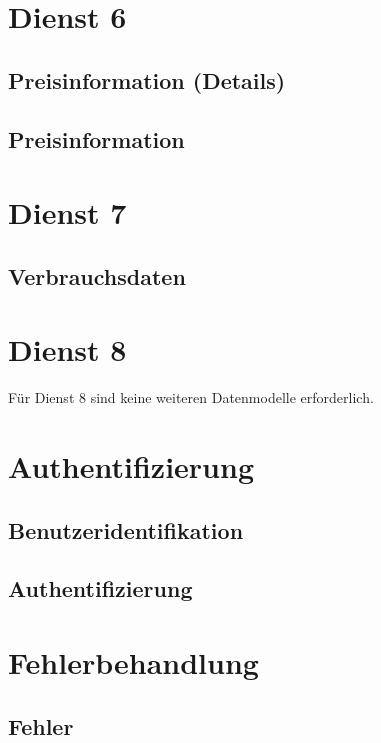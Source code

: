 \section{Dienst 6}
\label{sec:Datenmodell:Dienst6}

\subsection*{Preisinformation (Details)}



\subsection*{Preisinformation}




\section{Dienst 7}
\label{sec:Datenmodell:Dienst7}

\subsection*{Verbrauchsdaten}




\section{Dienst 8}
\label{sec:Datenmodell:Dienst8}
Für Dienst 8 sind keine weiteren Datenmodelle erforderlich.


\section{Authentifizierung}
\label{sec:Datenmodell:Auth}

\subsection*{Benutzeridentifikation}



\subsection*{Authentifizierung}




\section{Fehlerbehandlung}
\subsection*{Fehler}



